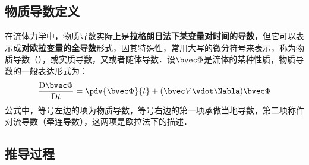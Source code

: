 
\subsection{物质导数定义}

在流体力学中，物质导数实际上是\textbf{拉格朗日法下某变量对时间的导数}，但它可以表示成\textbf{对欧拉变量的全导数}形式，因其特殊性，常用大写的微分符号来表示，称为物质导数（），或实质导数，又或者随体导数．设$\bvec \Phi$是流体的某种性质，物质导数的一般表达形式为：
\begin{align}
\frac{\mathrm{D}\bvec \Phi }{\mathrm{D} t}=\pdv{\bvec \Phi}{t}+(\bvec V \vdot \Nabla)\bvec \Phi
\end{align}
公式中，等号左边的项为物质导数，等号右边的第一项承做当地导数，第二项称作对流导数（牵连导数），这两项是欧拉法下的描述．

\subsection{推导过程}
